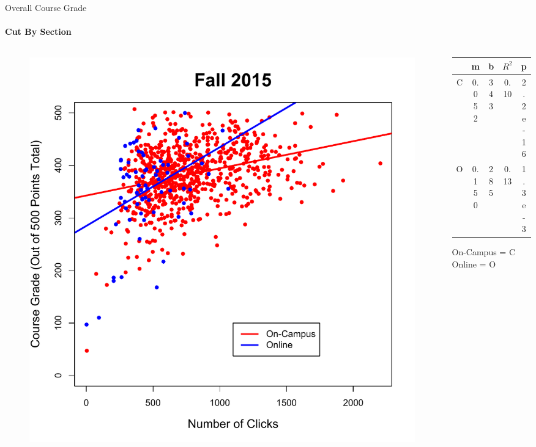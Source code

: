 \documentclass[xcolor=x11names,compress]{beamer}
\begin{document}
\begin{frame}{Overall Course Grade}
	\framesubtitle{Cut By Section}
	\begin{columns}
		\begin{column}{0.5\textwidth}
			\begin{figure}
				\includegraphics[width=1.0\textwidth]{img/overall_fa15_section.pdf}
			\end{figure}
		\end{column}
		\begin{column}{0.5\textwidth}	
			\begin{table}[ht]
				\begin{tabular}{|c|c|c|c|c|}
					\hline
					& \textbf{m} & \textbf{b} & \textbf{$R^2$} & \textbf{p}\\
					\hline
					C & 0.052 & 343 & 0.10 & 2.2e-16 \\
					O & 0.150 & 285 & 0.13 & 1.3e-3\\
					\hline
				\end{tabular}
			\end{table}
			On-Campus = C\\
			Online = O
		\end{column}
	\end{columns}
\end{frame}
\end{document}
